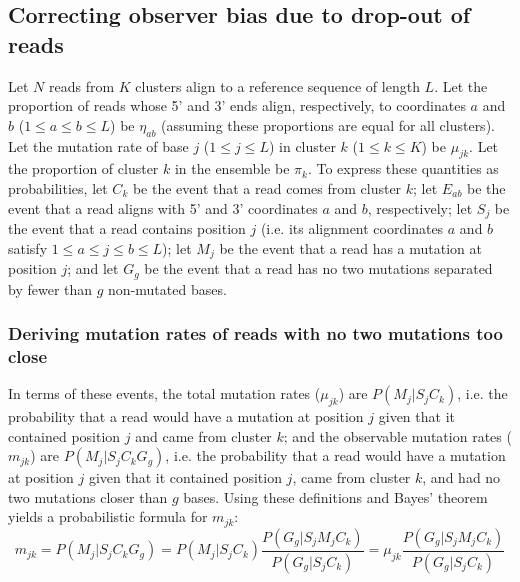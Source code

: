 \documentclass[main.tex]{subfiles}
\begin{document}
\subsection{Correcting observer bias due to drop-out of reads}

Let $N$ reads from $K$ clusters align to a reference sequence of length $L$.
Let the proportion of reads whose 5' and 3' ends align, respectively, to coordinates $a$ and $b$ ($1 \le a \le b \le L$) be $\eta_{ab}$ (assuming these proportions are equal for all clusters). Let the mutation rate of base $j$ ($1 \le j \le L$) in cluster $k$ ($1 \le k \le K$) be $\mu_{jk}$.
Let the proportion of cluster $k$ in the ensemble be $\pi_k$.
To express these quantities as probabilities, let $C_k$ be the event that a read comes from cluster $k$; let $E_{ab}$ be the event that a read aligns with 5' and 3' coordinates $a$ and $b$, respectively; let $S_j$ be the event that a read contains position $j$ (i.e. its alignment coordinates $a$ and $b$ satisfy $1 \le a \le j \le b \le L$); let $M_j$ be the event that a read has a mutation at position $j$; and let $G_g$ be the event that a read has no two mutations separated by fewer than $g$ non-mutated bases.

\subsubsection{Deriving mutation rates of reads with no two mutations too close}
\label{calc_p_mut_noclose}

In terms of these events, the total mutation rates ($\mu_{jk}$) are $P(M_j | S_j C_k)$, i.e. the probability that a read would have a mutation at position $j$ given that it contained position $j$ and came from cluster $k$; and the observable mutation rates ($m_{jk}$) are $P(M_j | S_j C_k G_g)$, i.e. the probability that a read would have a mutation at position $j$ given that it contained position $j$, came from cluster $k$, and had no two mutations closer than $g$ bases.
Using these definitions and Bayes' theorem yields a probabilistic formula for $m_{jk}$:
$$m_{jk} = P(M_j | S_j C_k G_g) = P(M_j | S_j C_k) \frac{P(G_g | S_j M_j C_k)}{P(G_g | S_j C_k)} = \mu_{jk} \frac{P(G_g | S_j M_j C_k)}{P(G_g | S_j C_k)}$$
\end{document}

